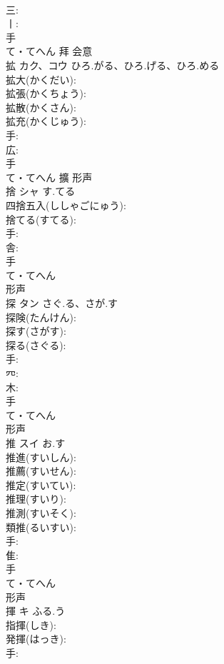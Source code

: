\documentclass[8pt]{extreport}
\begin{document}
\begin{CJK}{UTF8}{min}
\\	三: 
\\	丨: 
\\	手	
\\	て・てへん	拜	会意 
\\	拡	カク、コウ	ひろ.がる、ひろ.げる、ひろ.める		
\\	拡大(かくだい): 
\\	拡張(かくちょう): 
\\	拡散(かくさん): 
\\	拡充(かくじゅう): 
\\	手: 
\\	広: 
\\	手	
\\	て・てへん	擴	形声 
\\	捨	シャ	す.てる		
\\	四捨五入(ししゃごにゅう): 
\\	捨てる(すてる): 
\\	手: 
\\	舎: 
\\	手	
\\	て・てへん	
\\	形声 
\\	探	タン	さぐ.る、さが.す		
\\	探険(たんけん): 
\\	探す(さがす): 
\\	探る(さぐる): 
\\	手: 
\\	㓁: 
\\	木: 
\\	手	
\\	て・てへん	
\\	形声 
\\	推	スイ	お.す		
\\	推進(すいしん): 
\\	推薦(すいせん): 
\\	推定(すいてい): 
\\	推理(すいり): 
\\	推測(すいそく): 
\\	類推(るいすい): 
\\	手: 
\\	隹: 
\\	手	
\\	て・てへん	
\\	形声 
\\	揮	キ	ふる.う		
\\	指揮(しき): 
\\	発揮(はっき): 
\\	手: 

\end{CJK}
\end{document}
